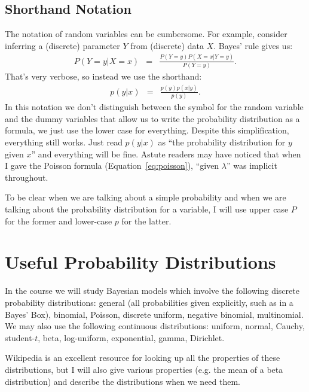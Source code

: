 \subsection{Shorthand Notation}
The notation of random variables can be cumbersome. For example, consider
inferring a (discrete) parameter $Y$ from (discrete) data $X$. Bayes' rule gives us:
\begin{eqnarray}
P(Y=y | X=x) &=& \frac{P(Y=y)P(X=x|Y=y)}{P(Y=y)}.
\end{eqnarray}
That's very verbose, so instead we use the shorthand:
\begin{eqnarray}
p(y | x) &=& \frac{p(y)p(x|y)}{p(y)}.
\end{eqnarray}
In this notation we don't distinguish between the symbol for the random variable
and the dummy variables that allow us to write the probability distribution as
a formula, we just use the lower case for everything. Despite this simplification,
everything still works. Just read
$p(y|x)$ as ``the probability distribution for $y$ given $x$'' and everything
will be fine. Astute readers may have noticed that when I gave the Poisson formula
(Equation~\ref{eq:poisson}), ``given $\lambda$'' was implicit throughout.

To be clear when we are talking about a simple probability and when we are
talking about the probability distribution for a variable, I will use upper case
$P$ for the former and lower-case $p$ for the latter.

\section{Useful Probability Distributions}
In the course we will study Bayesian models which involve the following
discrete probability distributions: general (all probabilities given explicitly,
such as in a Bayes' Box), binomial, Poisson, discrete uniform,
negative binomial, multinomial.
We may also use the following continuous distributions: uniform, normal,
Cauchy, student-$t$, beta, log-uniform, exponential, gamma, Dirichlet.

Wikipedia is an excellent resource for looking up all the properties of these
distributions, but I will also give various properties (e.g. the mean of a beta
distribution) and describe the distributions when we need them.

